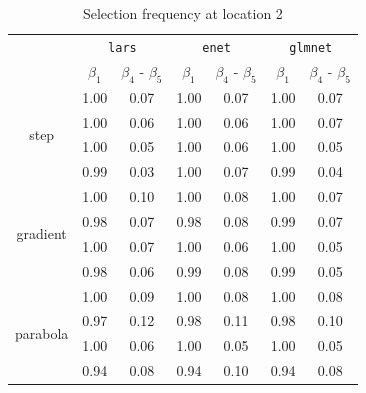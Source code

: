 \documentclass[authoryear, review, 11pt]{elsarticle}
\begin{document}
		\begin{table}[ht]
		\begin{center}
		\begin{tabular}{ccc|cc|cc}
		& \multicolumn{2}{c}{\texttt{lars}} & \multicolumn{2}{c}{\texttt{enet}} & \multicolumn{2}{c}{\texttt{glmnet}} \\
		& $\beta_1$ & $\beta_4$ - $\beta_5$ & $\beta_1$ & $\beta_4$ - $\beta_5$ & $\beta_1$ & $\beta_4$ - $\beta_5$ \\ 
		  \cline{2-7}
		  \multirow{4}{*}{step} & 1.00 & 0.07 & 1.00 & 0.07 & 1.00 & 0.07 \\ 
		  & 1.00 & 0.06 & 1.00 & 0.06 & 1.00 & 0.07 \\ 
		  & 1.00 & 0.05 & 1.00 & 0.06 & 1.00 & 0.05 \\ 
		  & 0.99 & 0.03 & 1.00 & 0.07 & 0.99 & 0.04 \\ 
		  \cline{2-7}
		  \multirow{4}{*}{gradient} & 1.00 & 0.10 & 1.00 & 0.08 & 1.00 & 0.07 \\ 
		  & 0.98 & 0.07 & 0.98 & 0.08 & 0.99 & 0.07 \\ 
		  & 1.00 & 0.07 & 1.00 & 0.06 & 1.00 & 0.05 \\ 
		  & 0.98 & 0.06 & 0.99 & 0.08 & 0.99 & 0.05 \\ 
		  \cline{2-7}
		  \multirow{4}{*}{parabola} & 1.00 & 0.09 & 1.00 & 0.08 & 1.00 & 0.08 \\ 
		  & 0.97 & 0.12 & 0.98 & 0.11 & 0.98 & 0.10 \\ 
		  & 1.00 & 0.06 & 1.00 & 0.05 & 1.00 & 0.05 \\ 
		  & 0.94 & 0.08 & 0.94 & 0.10 & 0.94 & 0.08 \\ 
		  \end{tabular}
		\caption{Selection frequency at location 2\label{table:loc2-selection}}
		\end{center}
		\end{table}
\end{document}
